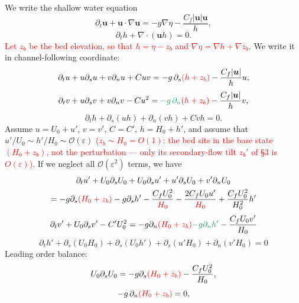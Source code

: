 \documentclass[11pt]{article}
\newcommand{\R}[1]{\textcolor{red}{#1}}
\newcommand{\G}[1]{\textcolor{ForestGreen}{#1}}
\newcommand{\bu}{\boldsymbol{u}}
\begin{document}
We write the shallow water equation
\begin{equation}
\partial_t\bu + \bu\cdot\nabla\bu = -g\nabla\eta - \frac{C_f|\bu|\bu}{h},
\end{equation}
\begin{equation}
\partial_t h + \nabla\cdot(\bu h) = 0 .
\end{equation}
\R{Let $z_b$ be the bed elevation, so that $h=\eta-z_b$ and $\nabla\eta=\nabla h+\nabla z_b$.}
We write it in channel-following coordinate:
\begin{equation}
\partial_t u + u\partial_s u + v\partial_n u + Cuv
  = -g\,\partial_s\R{(h+z_b)} - \frac{C_f|\bu|}{h}u ,
\end{equation}
\begin{equation}
\partial_t v + u\partial_s v + v\partial_n v - Cu^2
  = \G{-g\,\partial_n}\R{(h+z_b)} - \frac{C_f|\bu|}{h}v ,
\end{equation}
\begin{equation}
\partial_t h + \partial_s(uh) + \partial_n(vh) + Cvh = 0 .
\end{equation}
Assume $u=U_0+u'$, $v=v'$, $C=C'$, $h=H_0+h'$, and assume that
$u'/U_0\sim h'/H_0\sim \mathcal{O}(\varepsilon)$\R{ ($z_b\sim H_0=O(1)$: the bed
sits in the base state $(H_0+z_b)$, not the perturbation --- only its
secondary-flow tilt $z_b'$ of §3 is $O(\varepsilon)$)}.
If we neglect all $\mathcal{O}(\varepsilon^2)$ terms, we have
\begin{multline}
\partial_t u' + U_0\partial_s U_0 + U_0\partial_s u' + u'\partial_s U_0
  + v'\partial_n U_0\\
= -g\partial_s\R{(H_0+z_b)} - g\partial_s h'
  - \frac{C_fU_0^2}{\R{H_0}} - \frac{2C_fU_0u'}{\R{H_0}}
  + \frac{C_fU_0^2}{H_0^2}h'
\end{multline}
\begin{equation}
\partial_t v' + U_0\partial_s v' - C'U_0^2
 = -g\partial_n\R{(H_0+z_b)} \G{- g\partial_n h'} - \frac{C_fU_0v'}{H_0}
\end{equation}
\begin{equation}
\partial_t h' + \partial_s(U_0H_0) + \partial_s(U_0h') + \partial_s(u'H_0)
  + \partial_n(v'H_0) = 0
\end{equation}
Leading order balance:
\begin{equation}
U_0\partial_s U_0 = -g\partial_s\R{(H_0+z_b)} - \frac{C_fU_0^2}{H_0},
\end{equation}
\begin{equation}
-g\,\partial_n\R{(H_0+z_b)} = 0,
\end{equation}
\end{document}
